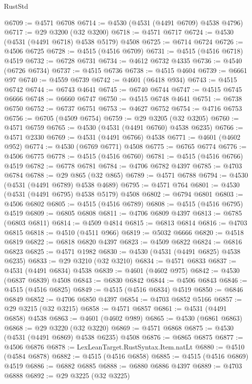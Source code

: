 \begin{lexlean}{RustStd}
\begin{coremodule}
@6709 := @4571 @6708
@6714 := @4530 (@4531 (@4491 @6709) @4538 @4796)
@6717 := @29 @3200 (@32 @3200)
@6718 := @4571 @6717
@6724 := @4530 (@4531 (@4491 @6718) @4538 @5179) @4508
@6725 := @6714 @6724
@6726 := @4506 @6725
@6728 := @4515 (@4516 @6709)
@6731 := @4515 (@4516 @6718) @4519
@6732 := @6728 @6731
@6734 := @4612 @6732 @4335
@6736 := @4540 (@6726 @6734)
@6737 := @4515 @6736
@6738 := @4515 @4604
@6739 := @6661 @97
@6740 := @4559 @6739
@6742 := @4601 (@6418 @934)
@6743 := @4515 @6742
@6744 := @6743 @4641
@6745 := @6740 @6744
@6747 := @4515 @6745 @6666
@6748 := @6660 @6747
@6750 := @4515 @6748 @4641
@6751 := @6738 @6750
@6752 := @6737 @6751
@6753 := @4627 @6752
@6754 := @4716 @6753
@6756 := @6705 (@4509 @6754)
@6759 := @29 @3205 (@32 @3205)
@6760 := @4571 @6759
@6765 := @4530 (@4531 (@4491 @6760) @4538 @6235)
@6766 := @4571 @2330
@6769 := @4531 (@4491 @6766) @4538
@6771 := @4601 (@4602 @952)
@6774 := @4530 (@6769 @6771) @4508
@6775 := @6765 @6774
@6776 := @4506 @6775
@6778 := @4515 (@4516 @6760)
@6781 := @4515 (@4516 @6766) @4519
@6782 := @6778 @6781
@6784 := @4706 @6782 @4397
@6785 := @4703 @6784
@6788 := @29 @865 (@32 @865)
@6789 := @4571 @6788
@6794 := @4530 (@4531 (@4491 @6789) @4538 @4689)
@6795 := @4571 @764
@6801 := @4530 (@4531 (@4491 @6795) @4538 @5179) @4508
@6802 := @6794 @6801
@6803 := @4506 @6802
@6805 := @4515 (@4516 @6789)
@6808 := @4515 (@4516 @6795) @4519
@6809 := @6805 @6808
@6811 := @4706 @6809 @4397
@6813 := @6785 (@6803 @6811)
@6814 := @4509 @4814
@6815 := @6813 @6814
@6816 := @4703 @6815
@6818 := @4510 (@4511 @966)
@6819 := @5032 @6666
@6820 := @4518 @6819
@6822 := @6818 @6820 @4397
@6823 := @4509 @6822
@6824 := @6816 @6823
@6825 := @4571 @1982
@6830 := @4530 (@4531 (@4491 @6825) @4538 @6235)
@6833 := @29 @3210 (@32 @3210)
@6834 := @4571 @6833
@6837 := @4531 (@4491 @6834) @4538
@6839 := @4601 (@4602 @975)
@6842 := @4530 (@6837 @6839) @4508
@6843 := @6830 @6842
@6844 := @4506 @6843
@6846 := @4515 (@4516 @6825)
@6849 := @4515 (@4516 @6834) @4519
@6850 := @6846 @6849
@6852 := @4706 @6850 @4397
@6854 := @4703 @6852 @5166
@6857 := @29 @3215 (@32 @3215)
@6858 := @4571 @6857
@6861 := @4531 (@4491 @6858) @4538
@6863 := @4601 (@4602 @989)
@6865 := @4530 (@6861 @6863)
@6868 := @29 @3220 (@32 @3220)
@6869 := @4571 @6868
@6875 := @4530 (@4531 (@4491 @6869) @4538 @6235) @4508
@6876 := @6865 @6875
@6877 := @4506 @6876
@6878 := LexLeanTarget.RustSyntax.Item.natLt
@6880 := @4510 (@4584 @6878)
@6882 := @4515 (@4516 @6858)
@6885 := @4515 (@4516 @6869) @4519
@6886 := @6882 @6885
@6888 := @6880 @6886 @4397
@6889 := @4703 @6888
@6892 := @29 @3225 (@32 @3225)

\end{coremodule}
\end{lexlean}

